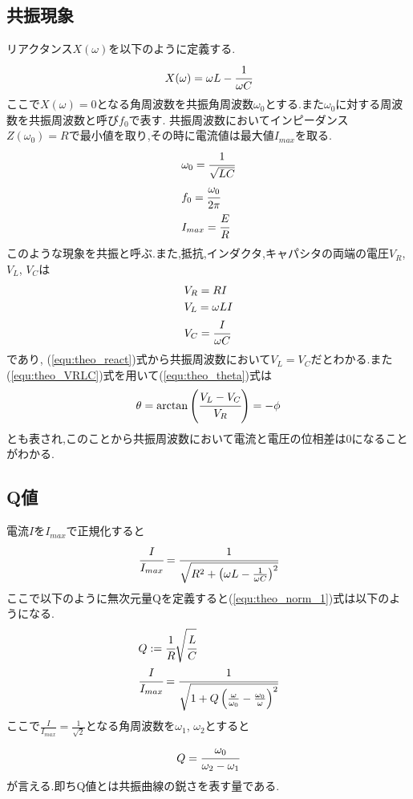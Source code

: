 \subsection{共振現象}
リアクタンス$X(\omega)$を以下のように定義する.
\begin{align}
  \label{equ:theo_react}
  X(\omega)=\omega L-\cfrac{1}{\omega C}
\end{align}
ここで$X(\omega)=0$となる角周波数を共振角周波数$\omega_0$とする.また$\omega_0$に対する周波数を共振周波数と呼び$f_0$で表す.
共振周波数においてインピーダンス$Z(\omega_0)=R$で最小値を取り,その時に電流値は最大値$I_{max}$を取る.
\begin{align}
  \label{equ:theo_omega0}
  &\omega_0=\cfrac{1}{\sqrt{LC}}\\
  \label{equ:theo_f0}
  &f_0=\cfrac{\omega_0}{2\pi}\\
  \label{equ:theo_imax}
  &I_{max}=\cfrac{E}{R}
\end{align}
このような現象を共振と呼ぶ.また,抵抗,インダクタ,キャパシタの両端の電圧$V_R$, $V_L$, $V_C$は
\begin{align}
  \label{equ:theo_VRLC}
  \begin{split}
  &V_R=RI\\
  &V_L=\omega LI\\
  &V_C=\cfrac{I}{\omega C}
  \end{split}
\end{align}
であり, (\ref{equ:theo_react})式から共振周波数において$V_L=V_C$だとわかる.また(\ref{equ:theo_VRLC})式を用いて(\ref{equ:theo_theta})式は
\begin{align}
  \label{equ:theo_theta2}
  \theta=\arctan\left(\cfrac{V_L-V_C}{V_R}\right)=-\phi
\end{align}
とも表され,このことから共振周波数において電流と電圧の位相差は0になることがわかる.
\subsection{Q値}
電流$I$を$I_{max}$で正規化すると
\begin{align}
  \label{equ:theo_norm_1}
  \cfrac{I}{I_{max}}=\cfrac{1}{\sqrt{R^2+\left(\omega L-\frac{1}{\omega C}\right)^2}}
\end{align}
ここで以下のように無次元量Qを定義すると(\ref{equ:theo_norm_1})式は以下のようになる.
\begin{align}
  \label{equ:theo_Q_1}
  &Q:=\cfrac{1}{R}\sqrt{\cfrac{L}{C}}\\
  \label{equ:theo_norm_2}
  &\cfrac{I}{I_{max}}=\cfrac{1}{\sqrt{1+Q\left(\frac{\omega}{\omega_0}-\frac{\omega_0}{\omega}\right)^2}}
\end{align}
ここで$\frac{I}{I_{max}}=\frac{1}{\sqrt{2}}$となる角周波数を$\omega_1$, $\omega_2$とすると
\begin{align}
  \label{equ:theo_Q_2}
  Q=\cfrac{\omega_0}{\omega_2-\omega_1}
\end{align}
が言える.即ちQ値とは共振曲線の鋭さを表す量である.
